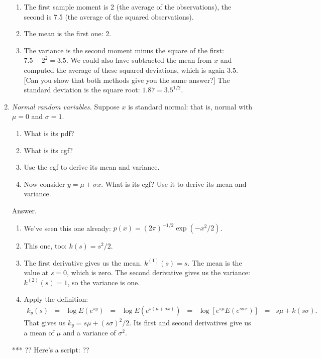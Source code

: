 \begin{enumerate}
\begin{enumerate}
\item The first sample moment is 2 (the average of the observations),
the second is 7.5 (the average of the squared observations).
\item The mean is the first one:  2.
\item The variance is the second moment minus the square of the first:
$7.5 - 2^2 = 3.5 $.
We could also have subtracted the mean from $x$
and computed the average of these squared deviations, which is again 3.5.
[Can you show that both methods give you the same answer?]
The standard deviation is the square root:  $1.87 = 3.5^{1/2} $.
\end{enumerate}

\item {\it Normal random variables.\/}
Suppose $x$ is standard normal:  that is, normal with $\mu = 0$ and $\sigma = 1$.
\begin{enumerate}
\item What is its pdf?
\item What is its cgf?
\item Use the cgf to derive its mean and variance.
\item Now consider $y = \mu + \sigma x$.
What is its cgf?
Use it to derive its mean and variance.
\end{enumerate}
%
Answer.
\begin{enumerate}
\item We've seen this one already:
$ p(x) = (2 \pi)^{-1/2} \exp(-x^2/2)$.
\item This one, too:  $ k(s) = s^2/2$.
\item The first derivative gives us the mean.
$k^{(1)}(s) = s$.
The mean is the value at $s=0$, which is zero.
The second derivative gives us the variance:
$k^{(2)}(s) = 1$,
so the variance is one.
\item Apply the definition:
\begin{eqnarray*}
    k_y(s) &=& \log E (e^{sy})
            \;\;=\;\; \log E (e^{s(\mu + \sigma x)})
             \;\;=\;\; \log \left[ e^{s\mu} E ( e^{ s\sigma x}) \right]
             \;\;=\;\; s \mu + k(s \sigma) .
\end{eqnarray*}
That gives us $k_y = s \mu + (s \sigma)^2/2 $.
Its first and second derivatives give us a mean of $\mu$ and a variance of $\sigma^2$.
\end{enumerate}

*** ?? Here's a script:  ??


\end{enumerate}

